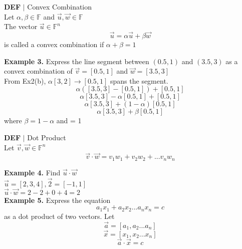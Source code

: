 \documentclass [12pt]{article}
\begin{document}
\begin{framed}
\textbf{DEF} $|$ Convex Combination\\
Let $\alpha,\beta\in\mathbb{F}$ and $\overrightarrow{u},\overrightarrow{w}\in\mathbb{F}$\\
The vector $\overrightarrow{u}\in\mathbb{F}^n$
\[\overrightarrow{u}=\alpha\overrightarrow{u}+\beta\overrightarrow{w}\]
is called a convex combination if $\alpha+\beta=1$
\end{framed}
\textbf{Example 3. } Express the line segment between $(0.5,1)$ and $(3.5, 3)$ as a convex combination of $\overrightarrow{v}=[0.5,1]$ and $\overrightarrow{w}=[3.5,3]$\\
From Ex2(b), $\alpha[3,2]\longrightarrow[0.5, 1]$ spans the segment.
\[\alpha ([3.5,3]-[0.5,1])+[0.5,1]\]
\[\alpha[3.5,3]-\alpha[0.5,1]+[0.5,1]\]
\[\alpha[3.5,3]+(1-\alpha)[0.5,1]\]
\[\alpha[3.5,3] + \beta[0.5,1]\]
where $\beta=1-\alpha$ and = 1
\begin{framed}
\textbf{DEF} $|$ Dot Product\\
Let $\overrightarrow{v},\overrightarrow{w}\in\mathbb{F}^n$
\[\overrightarrow{v}\cdot\overrightarrow{w}=v_1w_1+v_2w_2+...v_nw_n\]
\end{framed}
\noindent\textbf{Example 4. } Find $\overrightarrow{u}\cdot\overrightarrow{w}$\\
\indent$\overrightarrow{u} = [2,3,4], \overrightarrow{2}=[-1,1]$\\
\quad$\overrightarrow{u}\cdot\overrightarrow{w} = 2 - 2 + 0 + 4 = 2$\\
\textbf{Example 5.} Express the equation 
\[a_1x_1+a_2x_2...a_nx_n=c\]
as a dot product of two vectors. 
Let \[\overrightarrow{a}=[a_1,a_2...a_n]\]
\[\overrightarrow{x}=[x_1,x_2...x_n]\]
\[\overrightarrow{a}\cdot\overrightarrow{x}=c\]
\end{document}
